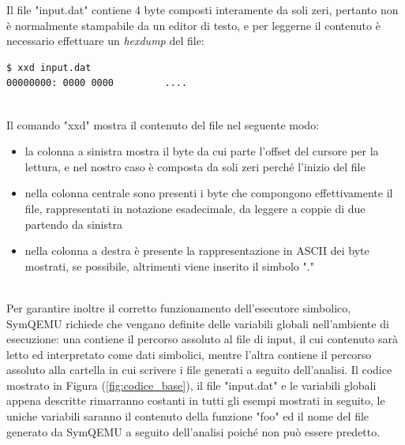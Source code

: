 \documentclass[Lau, oneside]{sapthesis}%
\begin{document}
\newpage
Il file "input.dat" contiene 4 byte composti interamente da soli zeri, pertanto non è normalmente stampabile da un editor di testo, e per leggerne il contenuto è necessario effettuare un \textit{hexdump} del file:
\begin{lstlisting}[xleftmargin=0\textwidth, language=bash]
$ xxd input.dat
00000000: 0000 0000         ....
\end{lstlisting}
\ \\
Il comando "xxd" mostra il contenuto del file nel seguente modo:
\begin{itemize}
    \item la colonna a sinistra mostra il byte da cui parte l'offset del cursore per la lettura, e nel nostro caso è composta da soli zeri perché l'inizio del file
    \item nella colonna centrale sono presenti i byte che compongono effettivamente il file, rappresentati in notazione esadecimale, da leggere a coppie di due partendo da sinistra
    \item nella colonna a destra è presente la rappresentazione in ASCII dei byte mostrati, se possibile, altrimenti viene inserito il simbolo "."
\end{itemize}
\ \\
Per garantire inoltre il corretto funzionamento dell'esecutore simbolico, SymQEMU richiede che vengano definite delle variabili globali nell'ambiente di esecuzione: una contiene il percorso assoluto al file di input, il cui contenuto sarà letto ed interpretato come dati simbolici, mentre l'altra contiene il percorso assoluto alla cartella in cui scrivere i file generati a seguito dell'analisi.
\newline \newline \newline
Il codice mostrato in Figura (\ref{fig:codice_base}), il file "input.dat" e le variabili globali appena descritte rimarranno costanti in tutti gli esempi mostrati in seguito, le uniche variabili saranno il contenuto della funzione "foo" ed il nome del file generato da SymQEMU a seguito dell'analisi poiché non può essere predetto.







\newpage
\end{document}
